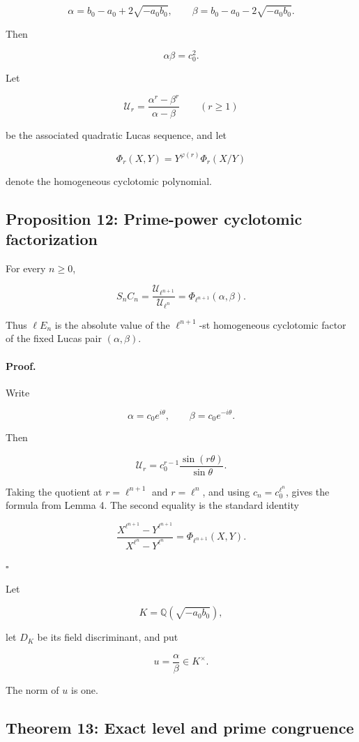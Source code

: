 \documentclass[11pt]{article}
\begin{document}
\[
\alpha
=
b_0-a_0+2\sqrt{-a_0b_0},
\qquad
\beta
=
b_0-a_0-2\sqrt{-a_0b_0}.
\]

Then

\[
\alpha\beta=c_0^2.
\]

Let

\[
\mathcal U_r
=
\frac{\alpha^r-\beta^r}
{\alpha-\beta}
\qquad(r\geq1)
\]

be the associated quadratic Lucas sequence, and let

\[
\Phi_r(X,Y)
=
Y^{\varphi(r)}
\Phi_r(X/Y)
\]

denote the homogeneous cyclotomic polynomial.

\subsection{Proposition 12: Prime-power cyclotomic factorization}

For every \(n\geq0\),

\[
S_nC_n
=
\frac{\mathcal U_{\ell^{n+1}}}
{\mathcal U_{\ell^n}}
=
\Phi_{\ell^{n+1}}(\alpha,\beta).
\]

Thus \(\ell E_n\) is the absolute value of the
\(\ell^{n+1}\)-st homogeneous cyclotomic factor of the fixed Lucas pair
\((\alpha,\beta)\).

\paragraph{Proof.}

Write

\[
\alpha=c_0e^{i\theta},
\qquad
\beta=c_0e^{-i\theta}.
\]

Then

\[
\mathcal U_r
=
c_0^{r-1}
\frac{\sin(r\theta)}
{\sin\theta}.
\]

Taking the quotient at \(r=\ell^{n+1}\) and \(r=\ell^n\), and using
\(c_n=c_0^{\ell^n}\), gives the formula from Lemma 4. The second equality
is the standard identity

\[
\frac{
X^{\ell^{n+1}}-Y^{\ell^{n+1}}
}{
X^{\ell^n}-Y^{\ell^n}
}
=
\Phi_{\ell^{n+1}}(X,Y).
\]

\(\square\)

Let

\[
K
=
\mathbb{Q}(\sqrt{-a_0b_0}),
\]

let \(D_K\) be its field discriminant, and put

\[
u=\frac{\alpha}{\beta}\in K^\times.
\]

The norm of \(u\) is one.

\subsection{Theorem 13: Exact level and prime congruence}
\end{document}
